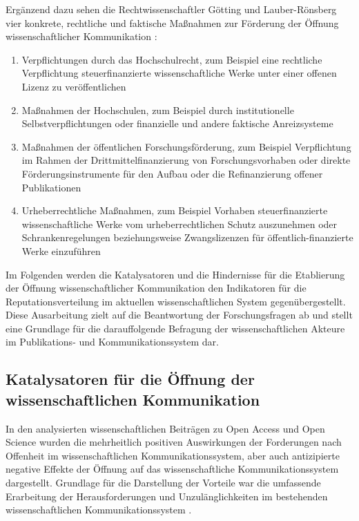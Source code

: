 Ergänzend dazu sehen die Rechtwissenschaftler Götting und Lauber-Rönsberg vier konkrete, rechtliche und faktische Maßnahmen zur Förderung der Öffnung wissenschaftlicher Kommunikation \cite{Goetting_2015}:
\begin{enumerate}
\item Verpflichtungen durch das Hochschulrecht, zum Beispiel eine rechtliche Verpflichtung steuerfinanzierte wissenschaftliche Werke unter einer offenen Lizenz zu veröffentlichen
\item Maßnahmen der Hochschulen, zum Beispiel durch institutionelle Selbstverpflichtungen oder finanzielle und andere faktische Anreizsysteme
\item Maßnahmen der öffentlichen Forschungsförderung, zum Beispiel Verpflichtung im Rahmen der Drittmittelfinanzierung von Forschungsvorhaben oder direkte Förderungsinstrumente für den Aufbau oder die Refinanzierung offener Publikationen
\item Urheberrechtliche Maßnahmen, zum Beispiel Vorhaben steuerfinanzierte wissenschaftliche Werke vom urheberrechtlichen Schutz auszunehmen oder Schrankenregelungen beziehungsweise Zwangslizenzen für öffentlich-finanzierte Werke einzuführen
\end{enumerate}

Im Folgenden werden die Katalysatoren und die Hindernisse für die Etablierung der Öffnung wissenschaftlicher Kommunikation den Indikatoren für die Reputationsverteilung im aktuellen wissenschaftlichen System gegenübergestellt. Diese Ausarbeitung zielt auf die Beantwortung der Forschungsfragen ab und stellt eine Grundlage für die darauffolgende Befragung der wissenschaftlichen Akteure im Publikations- und Kommunikationssystem dar.

\subsection{Katalysatoren für die Öffnung der wissenschaftlichen Kommunikation}

In den analysierten wissenschaftlichen Beiträgen zu Open Access und Open Science wurden die mehrheitlich positiven Auswirkungen der Forderungen nach Offenheit im wissenschaftlichen Kommunikationssystem, aber auch antizipierte negative Effekte der Öffnung auf das wissenschaftliche Kommunikationssystem dargestellt. Grundlage für die Darstellung der Vorteile war die umfassende Erarbeitung der Herausforderungen und Unzulänglichkeiten im bestehenden wissenschaftlichen Kommunikationssystem \cite{Herb_2012a}.

